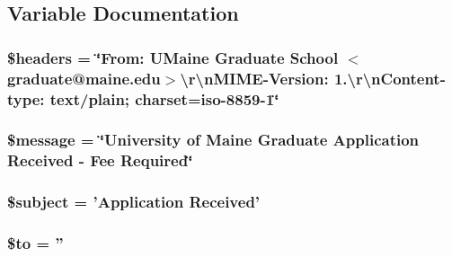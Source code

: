 \subsection{Variable Documentation}
\hypertarget{mail_pay_later_8email_8php_a52500036ee807241b8b4b7e2367c49ef}{
\subsubsection[{\$headers}]{\setlength{\rightskip}{0pt plus 5cm}\$headers = \char`\"{}From\-: U\-Maine Graduate School $<$graduate@maine.\-edu$>$\textbackslash{}r\textbackslash{}n\-M\-I\-M\-E-\/Version\-: 1.\textbackslash{}r\textbackslash{}n\-Content-\/type\-: text/plain; charset=iso-\/8859-\/1\char`\"{}}}\label{mail_pay_later_8email_8php_a52500036ee807241b8b4b7e2367c49ef}
\hypertarget{mail_pay_later_8email_8php_abf17cb2dba2ed17cb28aa5f37deb5293}{
\subsubsection[{\$message}]{\setlength{\rightskip}{0pt plus 5cm}\$message = \char`\"{}University of Maine Graduate {\bf Application} Received -\/ Fee Required\char`\"{}}}\label{mail_pay_later_8email_8php_abf17cb2dba2ed17cb28aa5f37deb5293}
\hypertarget{mail_pay_later_8email_8php_afea90503726cd5ad2eb80baf0b6d217d}{
\subsubsection[{\$subject}]{\setlength{\rightskip}{0pt plus 5cm}\$subject = '{\bf Application} Received'}}\label{mail_pay_later_8email_8php_afea90503726cd5ad2eb80baf0b6d217d}
\hypertarget{mail_pay_later_8email_8php_ac19f839b525d6d99d063fe56bf2a6d3b}{
\subsubsection[{\$to}]{\setlength{\rightskip}{0pt plus 5cm}\$to = ''}}\label{mail_pay_later_8email_8php_ac19f839b525d6d99d063fe56bf2a6d3b}
